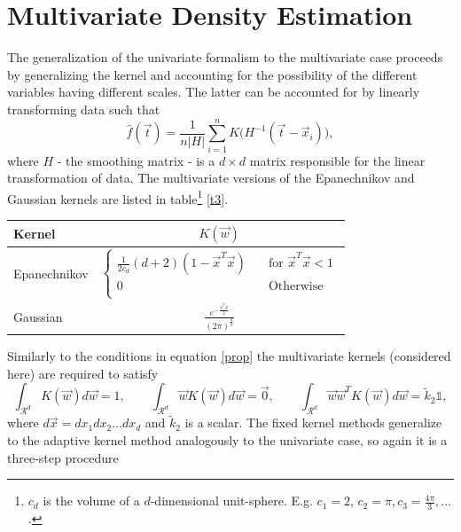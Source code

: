 \documentclass[
twoside,
openright,
titlepage,
numbers=noenddot,
headinclude,%
footinclude=true,
dottedtoc, %
ngerman,
american, %
pagesize=pdftex,
]{book}
\begin{document}
	
	
	\section{Multivariate Density Estimation}
	\label{sec:mul}
	\noindent The generalization of the univariate formalism to the multivariate case proceeds by generalizing the kernel and accounting for the possibility of the different variables having different scales. The latter can be accounted for by linearly transforming data such that
	\begin{equation}
		\hat{f}(\vec{t})=\frac{1}{n |H|}\sum_{i=1}^nK\big(H^{-1}(\vec{t}-\vec{x}_i)\big),
		\label{resc1}
	\end{equation}
	where $H$ - the smoothing matrix - is a $d\times d$ matrix responsible for the linear transformation of data. The multivariate versions of the Epanechnikov and Gaussian kernels are listed in table\footnote{$c_d$ is the volume of a $d$-dimensional unit-sphere. E.g. $c_1=2$, $c_2=\pi, c_3=\frac{4\pi}{3},\dots$.} \ref{t3}.
	\begin{center}
		\begin{tabular}{ l| c }
			Kernel & $K(\vec{w})$ \\
			\hline
			Epanechnikov & $\begin{cases}
				\frac{1}{2c_d}(d+2)(1-\vec{x}^T\vec{x})&\quad \text{for } \vec{x}^T\vec{x}<1\\
				0&\quad \text{Otherwise}\\
			\end{cases}$ \\
			Gaussian & $\frac{e^{-\frac{\vec{x}^T\vec{x}}{2}}}{(2\pi)^\frac{d}{2}}$ \\
		\end{tabular}
		\captionsetup{width=0.95\textwidth}
		\label{t3}
	\end{center}
	Similarly to the conditions in equation \eqref{prop} the multivariate kernels (considered here) are required to satisfy~\citep{Scott2015}
	\begin{equation}
		\int_{\mathcal{R}^d} K(\vec{w})d\vec{w}=1,\qquad \int_{\mathcal{R}^d} \vec{w}K(\vec{w})d\vec{w}=\vec{0},\qquad \int_{\mathcal{R}^d} \vec{w}\vec{w}^TK(\vec{w})d\vec{w}=\tilde{k}_2\mathbb{1},
		\label{prop2}
	\end{equation}
	where $d\vec{x}=dx_1dx_2\dots dx_d$ and $\tilde{k}_2$ is a scalar. The fixed kernel methods generalize to the adaptive kernel method analogously to the univariate case, so again it is a three-step procedure
\end{document}
